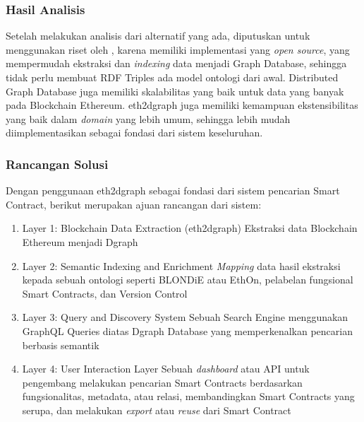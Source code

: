 
\subsubsection{Hasil Analisis}

Setelah melakukan analisis dari alternatif yang ada, diputuskan untuk menggunakan riset oleh \cite{aimar2023extraction}, karena memiliki implementasi yang \textit{open source}, yang mempermudah ekstraksi dan \textit{indexing} data menjadi Graph Database, sehingga tidak perlu membuat RDF Triples ada model ontologi dari awal. Distributed Graph Database juga memiliki skalabilitas yang baik untuk data yang banyak pada Blockchain Ethereum. eth2dgraph juga memiliki kemampuan ekstensibilitas yang baik dalam \textit{domain} yang lebih umum, sehingga lebih mudah diimplementasikan sebagai fondasi dari sistem keseluruhan.

\subsubsection{Rancangan Solusi}

Dengan penggunaan eth2dgraph sebagai fondasi dari sistem pencarian Smart Contract, berikut merupakan ajuan rancangan dari sistem:

\begin{enumerate}
	\item Layer 1: Blockchain Data Extraction (eth2dgraph) \newline Ekstraksi data Blockchain Ethereum menjadi Dgraph
	\item Layer 2: Semantic Indexing and Enrichment \newline \textit{Mapping} data hasil ekstraksi kepada sebuah ontologi seperti BLONDiE atau EthOn, pelabelan fungsional Smart Contracts, dan Version Control
	\item Layer 3: Query and Discovery System \newline Sebuah Search Engine menggunakan GraphQL Queries diatas Dgraph Database yang memperkenalkan pencarian berbasis semantik
	\item Layer 4: User Interaction Layer \newline Sebuah \textit{dashboard} atau API untuk pengembang melakukan pencarian Smart Contracts berdasarkan fungsionalitas, metadata, atau relasi, membandingkan Smart Contracts yang serupa, dan melakukan \textit{export} atau \textit{reuse} dari Smart Contract
\end{enumerate}
